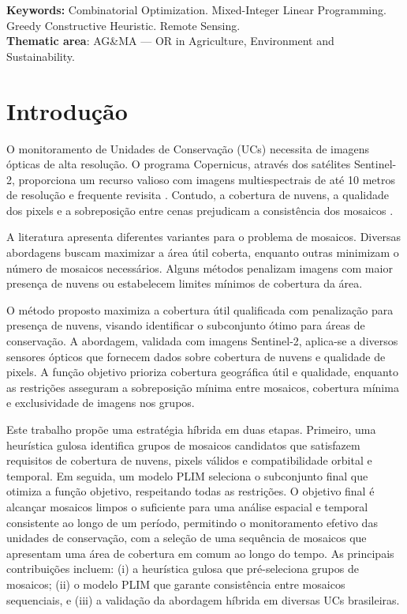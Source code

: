 \documentclass[a4paper,11pt]{article}
\begin{document}
\noindent
\textbf{Keywords:} Combinatorial Optimization. Mixed-Integer Linear Programming. Greedy Constructive Heuristic. Remote Sensing.\\
\noindent\textbf{Thematic area}: AG\&MA --- OR in Agriculture, Environment and Sustainability.
\newpage

\section{Introdução}
\vspace{-5mm}
O monitoramento de Unidades de Conservação (UCs) necessita de imagens ópticas de alta resolução. O programa Copernicus, através dos satélites Sentinel-2, proporciona um recurso valioso com imagens multiespectrais de até 10 metros de resolução e frequente revisita \citep{schuster:2020}. Contudo, a cobertura de nuvens, a qualidade dos pixels e a sobreposição entre cenas prejudicam a consistência dos mosaicos \citep{rodriguez-puerta:2024}.

A literatura apresenta diferentes variantes para o problema de mosaicos. Diversas abordagens buscam maximizar a área útil coberta, enquanto outras minimizam o número de mosaicos necessários. Alguns métodos penalizam imagens com maior presença de nuvens ou estabelecem limites mínimos de cobertura da área.

O método proposto maximiza a cobertura útil qualificada com penalização para presença de nuvens, visando identificar o subconjunto ótimo para áreas de conservação. A abordagem, validada com imagens Sentinel-2, aplica-se a diversos sensores ópticos que fornecem dados sobre cobertura de nuvens e qualidade de pixels. A função objetivo prioriza cobertura geográfica útil e qualidade, enquanto as restrições asseguram a sobreposição mínima entre mosaicos, cobertura mínima e exclusividade de imagens nos grupos.

Este trabalho propõe uma estratégia híbrida em duas etapas. Primeiro, uma heurística gulosa identifica grupos de mosaicos candidatos que satisfazem requisitos de cobertura de nuvens, pixels válidos e compatibilidade orbital e temporal. Em seguida, um modelo PLIM seleciona o subconjunto final que otimiza a função objetivo, respeitando todas as restrições. O objetivo final é alcançar mosaicos limpos o suficiente para uma análise espacial e temporal consistente ao longo de um período, permitindo o monitoramento efetivo das unidades de conservação, com a seleção de uma sequência de mosaicos que apresentam uma área de cobertura em comum ao longo do tempo. As principais contribuições incluem: (i) a heurística gulosa que pré-seleciona grupos de mosaicos; (ii) o modelo PLIM que garante consistência entre mosaicos sequenciais, e (iii) a validação da abordagem híbrida em diversas UCs brasileiras.
\end{document}
